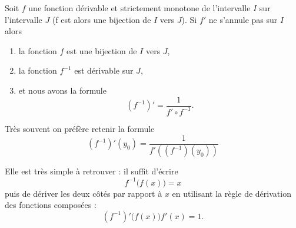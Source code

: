 \begin{proposition}      \label{PROPooSGTBooFxUuXK}
	Soit \(f \) une fonction dérivable et strictement monotone de l'intervalle \( I\) sur l'intervalle \( J\)  (f est alors une bijection de \( I\) vers \( J\)). Si \( f'\)  ne s'annule pas sur \( I\) alors
	\begin{enumerate}
		\item
		      la fonction \( f\) est une bijection de \( I\) vers \( J\),
		\item
		      la fonction \( f^{-1}\) est dérivable sur \( J\),
		\item
		      et nous avons la formule
		      \begin{equation}        \label{EQooELIHooDxUFxH}
			      (f^{-1})'=\frac{1}{ f'\circ f^{-1} }.
		      \end{equation}
	\end{enumerate}
\end{proposition}

\begin{normaltext}
	Très souvent on préfère retenir la formule
	\begin{equation}\label{EqWWAooBRFNsv}
		(f^{-1})'(y_0) = \frac{1}{f'\left((f^{-1})(y_0)\right)}
	\end{equation}

	Elle est très simple à retrouver : il suffit d'écrire
	\begin{equation}
		f^{-1}\big( f(x) \big)=x
	\end{equation}
	puis de dériver les deux côtés par rapport à \( x\) en utilisant la règle de dérivation des fonctions composées :
	\begin{equation}
		(f^{-1})'\big( f(x) \big)f'(x)=1.
	\end{equation}
\end{normaltext}

